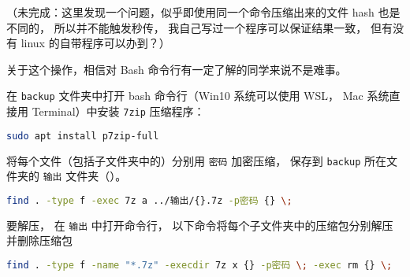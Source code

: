 （未完成：这里发现一个问题，似乎即使用同一个命令压缩出来的文件 hash 也是不同的， 所以并不能触发秒传， 我自己写过一个程序可以保证结果一致， 但有没有 linux 的自带程序可以办到？）

关于这个操作，相信对 Bash 命令行有一定了解的同学来说不是难事。

在 \verb|backup| 文件夹中打开 bash 命令行（Win10 系统可以使用 WSL， Mac 系统直接用 Terminal）中安装 \verb|7zip| 压缩程序：
\begin{lstlisting}[language=bash]
sudo apt install p7zip-full
\end{lstlisting}
将每个文件（包括子文件夹中的）分别用 \verb|密码| 加密压缩， 保存到 \verb|backup| 所在文件夹的 \verb|输出| 文件夹（）。
\begin{lstlisting}[language=bash]
find . -type f -exec 7z a ../输出/{}.7z -p密码 {} \;
\end{lstlisting}
要解压， 在 \verb|输出| 中打开命令行， 以下命令将每个子文件夹中的压缩包分别解压并删除压缩包
\begin{lstlisting}[language=bash]
find . -type f -name "*.7z" -execdir 7z x {} -p密码 \; -exec rm {} \;
\end{lstlisting}
